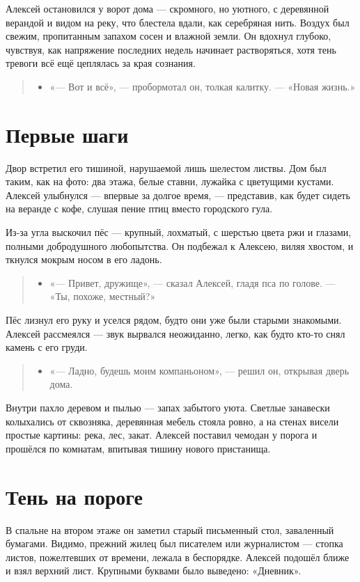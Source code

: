 \documentclass[12pt,a4paper]{book}
\newenvironment{dialogue}{\begin{quote}\itshape\begin{itemize}\item[]}{\end{itemize}\end{quote}}
\begin{document}
Алексей остановился у ворот дома — скромного, но уютного, с деревянной верандой и видом на реку, что блестела вдали, как серебряная нить. Воздух был свежим, пропитанным запахом сосен и влажной земли. Он вдохнул глубоко, чувствуя, как напряжение последних недель начинает растворяться, хотя тень тревоги всё ещё цеплялась за края сознания.

\begin{dialogue}
«— Вот и всё», — пробормотал он, толкая калитку. — «Новая жизнь.»
\end{dialogue}

\section{Первые шаги}

Двор встретил его тишиной, нарушаемой лишь шелестом листвы. Дом был таким, как на фото: два этажа, белые ставни, лужайка с цветущими кустами. Алексей улыбнулся — впервые за долгое время, — представив, как будет сидеть на веранде с кофе, слушая пение птиц вместо городского гула.

Из-за угла выскочил пёс — крупный, лохматый, с шерстью цвета ржи и глазами, полными добродушного любопытства. Он подбежал к Алексею, виляя хвостом, и ткнулся мокрым носом в его ладонь.

\begin{dialogue}
«— Привет, дружище», — сказал Алексей, гладя пса по голове. — «Ты, похоже, местный?»
\end{dialogue}

Пёс лизнул его руку и уселся рядом, будто они уже были старыми знакомыми. Алексей рассмеялся — звук вырвался неожиданно, легко, как будто кто-то снял камень с его груди.

\begin{dialogue}
«— Ладно, будешь моим компаньоном», — решил он, открывая дверь дома.
\end{dialogue}

Внутри пахло деревом и пылью — запах забытого уюта. Светлые занавески колыхались от сквозняка, деревянная мебель стояла ровно, а на стенах висели простые картины: река, лес, закат. Алексей поставил чемодан у порога и прошёлся по комнатам, впитывая тишину нового пристанища.

\section{Тень на пороге}

В спальне на втором этаже он заметил старый письменный стол, заваленный бумагами. Видимо, прежний жилец был писателем или журналистом — стопка листов, пожелтевших от времени, лежала в беспорядке. Алексей подошёл ближе и взял верхний лист. Крупными буквами было выведено: «Дневник».
\end{document}
